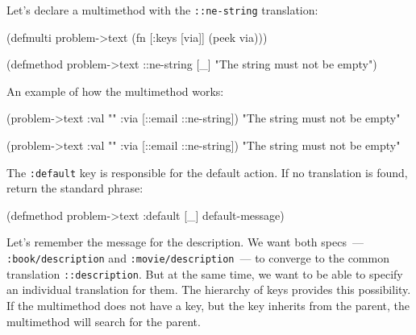 Let's declare a multimethod with the \texttt{::ne\--string} translation:


  \begin{clojure}
(defmulti problem->text
  (fn [{:keys [via]}]
    (peek via)))

(defmethod problem->text ::ne-string [_]
  "The string must not be empty")
  \end{clojure}

\noindent
An example of how the multimethod works:

\ifx\DEVICETYPE\MOBILE

  \begin{clojure}
(problem->text
  {:val "" :via [::email ::ne-string]})
"The string must not be empty"
  \end{clojure}

\else

  \begin{clojure}
(problem->text {:val "" :via [::email ::ne-string]})
"The string must not be empty"
  \end{clojure}

\fi

The \verb|:default| key is responsible for the default action. If no translation is found, return the standard phrase:

\begin{english}
  \begin{clojure}
(defmethod problem->text :default [_]
  default-message)
  \end{clojure}
\end{english}


Let's remember the message for the description. We want both specs~--- \verb|:book/description| and \verb|:movie/description|~--- to converge to the common translation \verb|::description|. But at the same time, we want to be able to specify an individual translation for them. The hierarchy of keys provides this possibility. If the multimethod does not have a key, but the key inherits from the parent, the multimethod will search for the parent.


